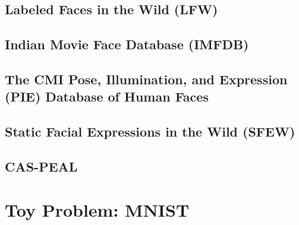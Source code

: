 \subsection*{Labeled Faces in the Wild (LFW)}
\subsection*{Indian Movie Face Database (IMFDB)}
\subsection*{The CMI Pose, Illumination, and Expression (PIE) Database of Human Faces}
\subsection*{Static Facial Expressions in the Wild (SFEW)}
\subsection*{CAS-PEAL}

\section{Toy Problem: MNIST}